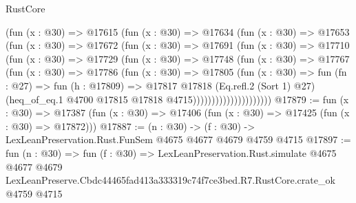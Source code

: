 \begin{lexlean}{RustCore}
\begin{coremodule}
                    (fun (x : @30) =>
                    @17615
                      (fun (x : @30) =>
                      @17634
                        (fun (x : @30) =>
                        @17653
                          (fun (x : @30) =>
                          @17672
                            (fun (x : @30) =>
                            @17691
                              (fun (x : @30) =>
                              @17710
                                (fun (x : @30) =>
                                @17729
                                  (fun (x : @30) =>
                                  @17748
                                    (fun (x : @30) =>
                                    @17767
                                      (fun (x : @30) =>
                                      @17786
                                        (fun (x : @30) =>
                                        @17805
                                          (fun (x : @30) =>
                                          fun (fn : @27) =>
                                          fun (h : @17809) =>
                                          @17817
                                            @17818
                                            (Eq.refl.{2} (Sort 1) @27)
                                            (heq_of_eq.{1}
                                              @4700
                                              @17815
                                              @17818
                                              @4715)))))))))))))))))))))
@17879 := fun (x : @30) =>
  @17387 (fun (x : @30) => @17406 (fun (x : @30) => @17425 (fun (x : @30) => @17872)))
@17887 := (n : @30) -> (f : @30) -> LexLeanPreservation.Rust.FunSem @4675 @4677 @4679 @4759 @4715
@17897 := fun (n : @30) =>
  fun (f : @30) =>
  LexLeanPreservation.Rust.simulate
    @4675
    @4677
    @4679
    LexLeanPreserve.Cbdc44465fad413a333319c74f7ce3bed.R7.RustCore.crate_ok
    @4759
    @4715
\end{coremodule}
\end{lexlean}
